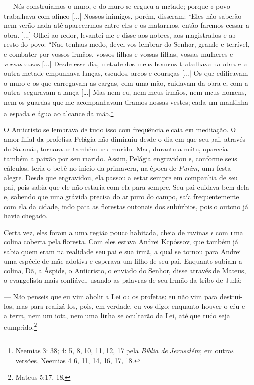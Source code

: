 --- Nós construíamos o muro, e do muro se ergueu a metade; porque o povo
trabalhava com afinco {[}...{]} Nossos inimigos, porém, disseram: ``Eles
não saberão nem verão nada até aparecermos entre eles e os matarmos,
então faremos cessar a obra. {[}...{]} Olhei ao redor, levantei-me e
disse aos nobres, aos magistrados e ao resto do povo: ``Não tenhais
medo, devei vos lembrar do Senhor, grande e terrível, e combater por
vossos irmãos, vossos filhos e vossas filhas, vossas mulheres e vossas
casas {[}...{]} Desde esse dia, metade dos meus homens trabalhava na
obra e a outra metade empunhava lanças, escudos, arcos e couraças
{[}...{]} Os que edificavam o muro e os que carregavam as cargas, com
uma mão, cuidavam da obra e, com a outra, seguravam a lança {[}...{]}
Mas nem eu, nem meus irmãos, nem meus homens, nem os guardas que me
acompanhavam tiramos nossas vestes; cada um mantinha a espada e água ao
alcance da mão.\footnote{Neemias 3: 38; 4: 5, 8, 10, 11, 12, 17 pela
  \emph{Bíblia de Jerusalém}; em outras versões, Neemias 4 6, 11, 14,
  16, 17, 18.}

O Anticristo se lembrava de tudo isso com frequência e caía em
meditação. O amor filial da profetisa Pelágia não diminuiu desde o dia
em que seu pai, através de Satanás, tornara-se também seu marido. Mas,
durante a noite, aparecia também a paixão por seu marido. Assim, Pelágia
engravidou e, conforme seus cálculos, teria o bebê no início da
primavera, na época de \emph{Purim}, uma festa alegre. Desde que
engravidou, ela passou a estar sempre em companhia de seu pai, pois
sabia que ele não estaria com ela para sempre. Seu pai cuidava bem dela
e, sabendo que uma grávida precisa do ar puro do campo, saía
frequentemente com ela da cidade, indo para as florestas outonais dos
subúrbios, pois o outono já havia chegado.

Certa vez, eles foram a uma região pouco habitada, cheia de ravinas e
com uma colina coberta pela floresta. Com eles estava Andrei Kopóssov,
que também já sabia quem eram na realidade seu pai e sua irmã, a qual se
tornou para Andrei uma espécie de mãe adotiva e esperava um filho de seu
pai. Enquanto subiam a colina, Dã, a Áspide, o Anticristo, o enviado do
Senhor, disse através de Mateus, o evangelista mais confiável, usando as
palavras de seu Irmão da tribo de Judá:

--- Não penseis que eu vim abolir a Lei ou os profetas; eu não vim para
destruí-los, mas para realizá-los, pois, em verdade, eu vos digo:
enquanto houver o céu e a terra, nem um iota, nem uma linha se ocultarão
da Lei, até que tudo seja cumprido.\footnote{Mateus 5:17, 18.}

